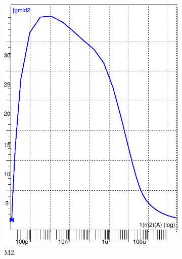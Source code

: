 \begin{figure}[!tbp]
\begin{subfigure}[b]{0.35\textwidth}
   \includegraphics[width=\textwidth]{images/gmid_log10id_m2}
   \caption{M2.}
   \end{subfigure}
 \begin{subfigure}[b]{0.355\textwidth}

\end{subfigure}
\end{figure}
